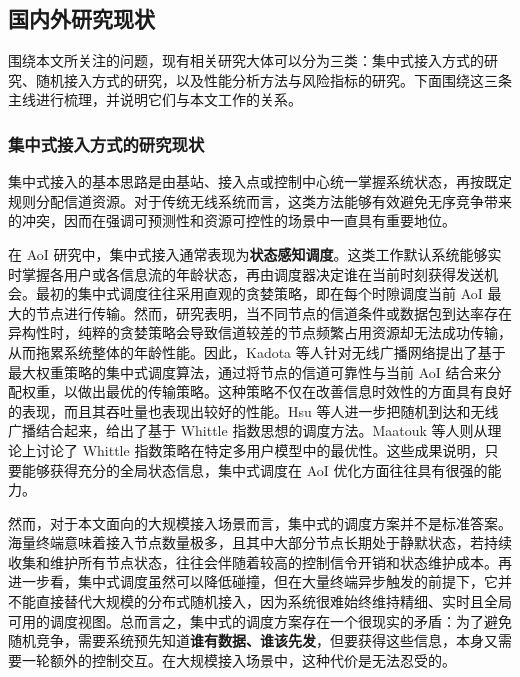 \subsection{国内外研究现状}

围绕本文所关注的问题，现有相关研究大体可以分为三类：集中式接入方式的研究、随机接入方式的研究，以及性能分析方法与风险指标的研究。下面围绕这三条主线进行梳理，并说明它们与本文工作的关系。

\subsubsection{集中式接入方式的研究现状}

集中式接入的基本思路是由基站、接入点或控制中心统一掌握系统状态，再按既定规则分配信道资源\cite{takita2013centralized}。对于传统无线系统而言，这类方法能够有效避免无序竞争带来的冲突，因而在强调可预测性和资源可控性的场景中一直具有重要地位。

在 AoI 研究中，集中式接入通常表现为\textbf{状态感知调度}。这类工作默认系统能够实时掌握各用户或各信息流的年龄状态，再由调度器决定谁在当前时刻获得发送机会。最初的集中式调度往往采用直观的贪婪策略，即在每个时隙调度当前 AoI 最大的节点进行传输\cite{kadota2016minimizing}。然而，研究表明，当不同节点的信道条件或数据包到达率存在异构性时，纯粹的贪婪策略会导致信道较差的节点频繁占用资源却无法成功传输，从而拖累系统整体的年龄性能\cite{kadota2019minimizing}。因此，Kadota 等人针对无线广播网络提出了基于最大权重策略的集中式调度算法，通过将节点的信道可靠性与当前 AoI 结合来分配权重，以做出最优的传输策略\cite{kadota2018scheduling}。这种策略不仅在改善信息时效性的方面具有良好的表现，而且其吞吐量也表现出较好的性能。Hsu 等人进一步把随机到达和无线广播结合起来，给出了基于 Whittle 指数思想的调度方法\cite{hsu2019scheduling}。Maatouk 等人则从理论上讨论了 Whittle 指数策略在特定多用户模型中的最优性\cite{kriouile2021global}。这些成果说明，只要能够获得充分的全局状态信息，集中式调度在 AoI 优化方面往往具有很强的能力。

然而，对于本文面向的大规模接入场景而言，集中式的调度方案并不是标准答案。海量终端意味着接入节点数量极多，且其中大部分节点长期处于静默状态，若持续收集和维护所有节点状态，往往会伴随着较高的控制信令开销和状态维护成本\cite{yalda2024comparative}。再进一步看，集中式调度虽然可以降低碰撞，但在大量终端异步触发的前提下，它并不能直接替代大规模的分布式随机接入，因为系统很难始终维持精细、实时且全局可用的调度视图\cite{jiang2018decentralized}。总而言之，集中式的调度方案存在一个很现实的矛盾：为了避免随机竞争，需要系统预先知道\textbf{谁有数据、谁该先发}，但要获得这些信息，本身又需要一轮额外的控制交互。在大规模接入场景中，这种代价是无法忍受的。

